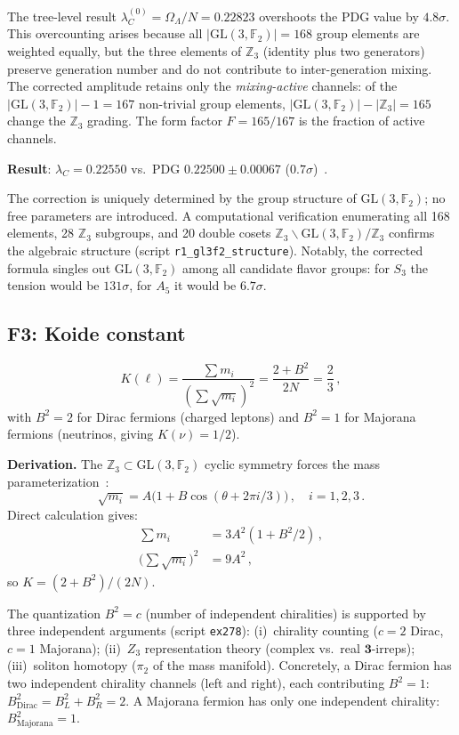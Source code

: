 \documentclass[aps,prd,twocolumn,superscriptaddress,showpacs,
  nofootinbib,floatfix,longbibliography]{revtex4-2}
\newcommand{\OL}{\Omega_\Lambda}
\newcommand{\GL}{\mathrm{GL}(3,\mathbb{F}_2)}
\newcommand{\ZZ}{\mathbb{Z}}
\begin{document}
The tree-level result $\lambda_C^{(0)} = \OL/N = 0.22823$ overshoots
the PDG value by $4.8\sigma$. This overcounting arises because all
$|\GL| = 168$ group elements are weighted equally, but the three
elements of $\ZZ_3$ (identity plus two generators) preserve generation
number and do not contribute to inter-generation mixing.
The corrected amplitude retains only the \emph{mixing-active} channels:
of the $|\GL| - 1 = 167$ non-trivial group elements,
$|\GL| - |\ZZ_3| = 165$ change the $\ZZ_3$ grading.
The form factor $F = 165/167$ is the fraction of active channels.

\textbf{Result}: $\lambda_C = 0.22550$ vs.\ PDG $0.22500 \pm 0.00067$
($0.7\sigma$)~\cite{PDG2024}.

The correction is uniquely determined by the group structure of $\GL$;
no free parameters are introduced. A computational verification
enumerating all 168 elements, 28 $\ZZ_3$ subgroups, and 20 double
cosets $\ZZ_3 \backslash \GL / \ZZ_3$ confirms the algebraic structure
(script \texttt{r1\_gl3f2\_structure}).
Notably, the corrected formula singles out $\GL$ among all candidate
flavor groups: for $S_3$ the tension would be $131\sigma$, for $A_5$
it would be $6.7\sigma$.


\subsection{F3: Koide constant}\label{ssec:F3}

\begin{equation}\label{eq:F3}
  \boxed{K(\ell) = \frac{\sum m_i}{(\sum\!\sqrt{m_i})^2}
  = \frac{2 + B^2}{2N} = \frac{2}{3}}\,,
\end{equation}
with $B^2 = 2$ for Dirac fermions (charged leptons) and
$B^2 = 1$ for Majorana fermions (neutrinos, giving $K(\nu) = 1/2$).

\textbf{Derivation.}
The $\ZZ_3 \subset \GL$ cyclic symmetry forces the mass
parameterization~\cite{Koide1982}:
\begin{equation}\label{eq:koide-param}
  \sqrt{m_i} = A\bigl(1 + B\cos(\theta + 2\pi i/3)\bigr)\,,
  \quad i = 1, 2, 3\,.
\end{equation}
Direct calculation gives:
\begin{align}
  \sum m_i &= 3A^2(1 + B^2/2)\,, \\
  \bigl(\sum\!\sqrt{m_i}\bigr)^2 &= 9A^2\,,
\end{align}
so $K = (2 + B^2)/(2N)$.

The quantization $B^2 = c$ (number of independent chiralities) is
supported by three independent arguments (script \texttt{ex278}):
(i)~chirality counting ($c = 2$ Dirac, $c = 1$ Majorana);
(ii)~$Z_3$ representation theory (complex vs.\ real $\mathbf{3}$-irreps);
(iii)~soliton homotopy ($\pi_2$ of the mass manifold).
Concretely, a Dirac fermion has two independent chirality channels
(left and right), each contributing $B^2 = 1$:
$B^2_\mathrm{Dirac} = B_L^2 + B_R^2 = 2$.
A Majorana fermion has only one independent chirality:
$B^2_\mathrm{Majorana} = 1$.
\end{document}
